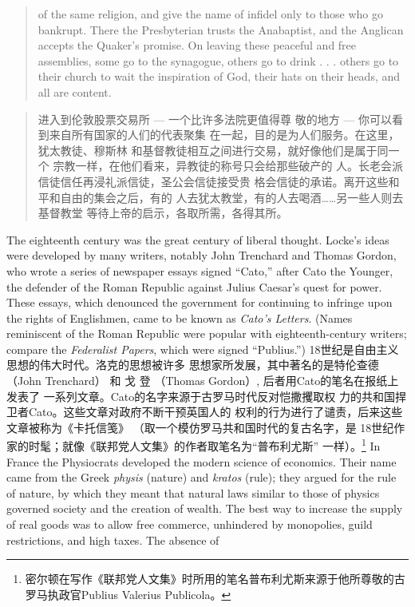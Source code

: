 \begin{paracol}{2}
\begin{quote}
of the same religion, and give the name of infidel only to those
who go bankrupt. There the Presbyterian trusts the Anabaptist,
and the Anglican accepts the Quaker's promise. On leaving these
peaceful and free assemblies, some go to the synagogue, others go
to drink . . . others go to their church to wait the inspiration of
God, their hats on their heads, and all are content.
\end{quote}
\switchcolumn
\begin{quote}
进入到伦敦股票交易所 --- 一个比许多法院更值得尊
敬的地方 --- 你可以看到来自所有国家的人们的代表聚集
在一起，目的是为人们服务。在这里，犹太教徒、穆斯林
和基督教徒相互之间进行交易，就好像他们是属于同一个
宗教一样，在他们看来，异教徒的称号只会给那些破产的
人。长老会派信徒信任再浸礼派信徒，圣公会信徒接受贵
格会信徒的承诺。离开这些和平和自由的集会之后，有的
人去犹太教堂，有的人去喝酒……另一些人则去基督教堂
等待上帝的启示，各取所需，各得其所。
\end{quote}
\switchcolumn*
The eighteenth century was the great century of liberal
thought. Locke's ideas were developed by many writers, notably John Trenchard and Thomas Gordon, who wrote a series of newspaper essays signed ``Cato,'' after Cato the Younger, the
defender of the Roman Republic against Julius Caesar's quest
for power. These essays, which denounced the government for
continuing to infringe upon the rights of Englishmen, came to
be known as \textit{Cato's Letters}. (Names reminiscent of the Roman
Republic were popular with eighteenth-century writers; compare the \textit{Federalist Papers}, which were signed ``Publius.'') 
\switchcolumn
18世纪是自由主义思想的伟大时代。洛克的思想被许多
思想家所发展，其中著名的是特伦查德（John Trenchard） 和
戈 登 （Thomas  Gordon）, 后者用Cato的笔名在报纸上发表了
一系列文章。Cato的名字来源于古罗马时代反对恺撒攫取权
力的共和国捍卫者Cato。这些文章对政府不断干预英国人的
权利的行为进行了谴责，后来这些文章被称为《卡托信笺》
（取一个模仿罗马共和国时代的复古名字，是 18世纪作家的时髦；就像《联邦党人文集》的作者取笔名为“普布利尤斯”
一样）。\footnote{密尔顿在写作《联邦党人文集》时所用的笔名普布利尤斯来源于他所尊敬的古罗马执政官Publius Valerius Publicola。}
\switchcolumn*
In France the Physiocrats developed the modern science of economics. Their name came from the Greek \textit{physis} (nature) and \textit{kratos} (rule); they argued for the rule of nature, by which they meant that natural laws similar to those of physics governed society and the creation of wealth. The best way to increase the
supply of real goods was to allow free commerce, unhindered by
monopolies, guild restrictions, and high taxes. The absence of

\end{paracol}
